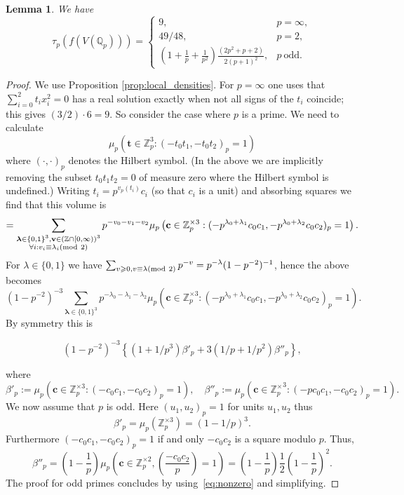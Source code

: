 \documentclass[a4paper,12pt,reqno]{amsart}
\numberwithin{equation}{section} \numberwithin{figure}{section}
\newcommand\Z{\mathbb{Z}}
\newcommand\Q{\mathbb{Q}}
\newcommand{\md}[1]{  \left(\textnormal{mod}\ #1\right)}
\renewcommand{\l}{\left}
\renewcommand{\r}{\right}
\renewcommand{\b}{\mathbf}
\renewcommand{\geq}{\geqslant}
\renewcommand{\#}{\sharp}
\newtheorem{lemma}{Lemma}
\theoremstyle{definition}
\numberwithin{lemma}{section}
\newcommand{\beq}[2]
{
\begin{equation}
\label{#1}
{#2}
\end{equation}
}
\begin{document}
\begin{lemma}\label{lem:oddprimeshaar}
	We have 
	$$
	\tau_p(f(V(\Q_p)))= 
	\begin{cases}
		9, & p = \infty,\\
		49/48, & p = 2, \\
		\l(1+\frac{1}{p}+ \frac{1}{p^2} \r) \frac{(2p^2+p+2)}{2(p+1)^2}, &
		p \ \mathrm{ odd}.
	\end{cases}$$
 \end{lemma}
 \begin{proof} 
 	We use Proposition \ref{prop:local_densities}. For $p = \infty$ one uses
 	that $ \sum_{i=0}^2 t_i x_i^2=0$ has a real solution exactly when not all signs of 
the $t_i$ coincide; this gives $(3/2) \cdot 6 = 9$. So consider the case where $p$ is a prime.
We need to calculate
\[\mu_p\l(\b t \in \Z_p^3: (-t_0t_1,-t_0t_2)_p = 1 \r)\]
where $(\cdot,\cdot)_p$ denotes the Hilbert symbol. (In the above we are implicitly
removing the subset $t_0t_1t_2 = 0$ of measure zero where the Hilbert symbol is undefined.)
Writing $t_i=p^{v_p(t_i)}{c_i}$ (so that $c_i$ is a unit)
and absorbing squares we find that this volume is
\begin{align*}
=\sum_{\substack{\boldsymbol \lambda\in \{0,1\}^3, \b v \in (\Z\cap[0,\infty))^3\\
\forall i : v_i\equiv \lambda_i \md 2
}}
p^{-v_0-v_1-v_2}
 \mu_p\l( \b c \in \Z_p^{\times 3}:
(-p^{\lambda_0 + \lambda_1}c_0c_1,-p^{\lambda_0 + \lambda_2}c_0c_2)_p = 1\r).
\end{align*}
For $\lambda \in \{0,1\}$
we have 
$
\sum_{   v \geq 0 ,  v \equiv \lambda  \md 2}
p^{-v}=  p^{-\lambda}  (1-p^{-2})^{-1}  $, hence the  above becomes 
\[
  (1-p^{-2})^{-3}
\sum_{\boldsymbol \lambda\in \{0,1\}^3 }p^{-\lambda_0-\lambda_1-\lambda_2}
 \mu_p\l( \b c \in 
\Z_p^{\times 3}:
(-p^{\lambda_0 + \lambda_1}c_0c_1,-p^{\lambda_0 + \lambda_2}c_0c_2)_p = 1 \r).\]
By symmetry this is 
\beq{eq:nonzero}{
 (1-p^{-2})^{-3}\l\{
  (1+1/p^3 ) 
\beta'_p
 +3
(1/p+1/p^2 )
  \beta''_p \r\}
,}
where 
$$
\beta'_p:=\mu_p\l( \b c \in \Z_p^{\times 3}: (-c_0c_1,-c_0c_2)_p = 1 \r),
\quad  \beta''_p:=
\mu_p\l( \b c \in 
{\Z_p^\times}^3:
(-pc_0c_1,-c_0c_2)_p = 1 \r).$$
We now assume that $p$ is odd. Here $(u_1,u_2)_p=1$ for units $u_1,u_2$ thus 
\[\beta'_p=
\mu_p( \Z_p^{\times 3} )=(1-1/p)^3.\] Furthermore $(-c_0c_1,-c_0c_2)_p = 1$ if and only 
$-c_0c_2$ is a square modulo $p$. Thus, 
\[  \beta''_p=   \l(1-\frac{1}{p}\r)\mu_p\l(\b c \in \Z_p^{\times 2}, \l(\frac{-c_0c_2}{p}\r)=1 \r)=  \l(1-\frac{1}{p}\r)\frac{1}{2}  \l(1-\frac{1}{p}\r)^2.\] The proof for odd primes concludes by using~\eqref{eq:nonzero} and simplifying.

\end{proof}
\end{document}
